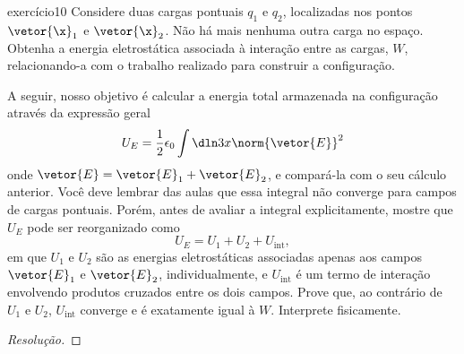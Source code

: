 \begin{exercício}{}{exercício10}
    Considere duas cargas pontuais \(q_1\) e \(q_2\), localizadas nos pontos \(\vetor{\x}_1\) e \(\vetor{\x}_2\). Não há mais nenhuma outra carga no espaço. Obtenha a energia eletrostática associada à interação entre as cargas, \(W\), relacionando-a com o trabalho realizado para construir a configuração.

    A seguir, nosso objetivo é calcular a energia total armazenada na configuração através da expressão geral
    \begin{equation*}
        U_E = \frac12 \epsilon_0 \int\dln3x\norm{\vetor{E}}^2
    \end{equation*}
    onde \(\vetor{E} = \vetor{E}_1 + \vetor{E}_2\), e compará-la com o seu cálculo anterior. Você deve lembrar das aulas que essa integral não converge para campos de cargas pontuais. Porém, antes de avaliar a integral explicitamente, mostre que \(U_E\) pode ser reorganizado como
    \begin{equation*}
        U_E = U_1 + U_2 + U_\mathrm{int},
    \end{equation*}
    em que \(U_1\) e \(U_2\) são as energias eletrostáticas associadas apenas aos campos \(\vetor{E}_1\) e \(\vetor{E}_2\), individualmente, e \(U_{\mathrm{int}}\) é um termo de interação envolvendo produtos cruzados entre os dois campos. Prove que, ao contrário de \(U_1\) e \(U_2\), \(U_\mathrm{int}\) converge e é exatamente igual à \(W\). Interprete fisicamente.
\end{exercício}
\begin{proof}[Resolução]

\end{proof}
